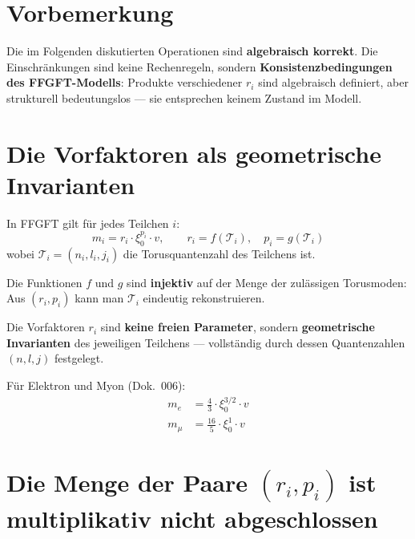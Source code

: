 
\section*{Vorbemerkung}

Die im Folgenden diskutierten Operationen sind \textbf{algebraisch korrekt}.
Die Einschränkungen sind keine Rechenregeln, sondern
\textbf{Konsistenzbedingungen des FFGFT-Modells}:
Produkte verschiedener $r_i$ sind algebraisch definiert,
aber strukturell bedeutungslos --- sie entsprechen keinem
Zustand im Modell.

\section{Die Vorfaktoren als geometrische Invarianten}

In FFGFT gilt für jedes Teilchen $i$:
\begin{equation}
  m_i = r_i \cdot \xi_0^{p_i} \cdot v,
  \qquad r_i = f(\mathcal{T}_i), \quad p_i = g(\mathcal{T}_i)
\end{equation}
wobei $\mathcal{T}_i = (n_i, l_i, j_i)$ die Torusquantenzahl des Teilchens ist.

Die Funktionen $f$ und $g$ sind \textbf{injektiv} auf der Menge der
zulässigen Torusmoden: Aus $(r_i, p_i)$ kann man $\mathcal{T}_i$ eindeutig
rekonstruieren.

Die Vorfaktoren $r_i$ sind \textbf{keine freien Parameter}, sondern
\textbf{geometrische Invarianten} des jeweiligen Teilchens ---
vollständig durch dessen Quantenzahlen $(n,l,j)$ festgelegt.

Für Elektron und Myon (Dok.~006):
\begin{align}
  m_e &= \frac{4}{3} \cdot \xi_0^{3/2} \cdot v \label{eq:me}\\
  m_\mu &= \frac{16}{5} \cdot \xi_0^{1} \cdot v \label{eq:mmu}
\end{align}

\section{Die Menge der Paare \texorpdfstring{\texorpdfstring{\texorpdfstring{$(r_i,p_i)$}{(ri,pi)}}{(ri,pi)}}{(ri,pi)} ist multiplikativ nicht abgeschlossen}

